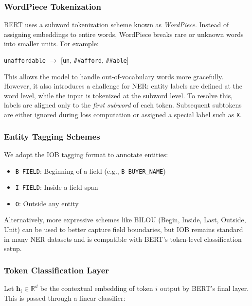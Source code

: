 \documentclass{article}
\begin{document}
\subsubsection{WordPiece Tokenization}

BERT uses a subword tokenization scheme known as \emph{WordPiece}. Instead of assigning embeddings to entire words, WordPiece breaks rare or unknown words into smaller units. For example:

\begin{center}
    \texttt{unaffordable} $\rightarrow$ [\texttt{un}, \texttt{\#\#afford}, \texttt{\#\#able}]
\end{center}

This allows the model to handle out-of-vocabulary words more gracefully. However, it also introduces a challenge for NER: entity labels are defined at the word level, while the input is tokenized at the subword level. To resolve this, labels are aligned only to the \emph{first subword} of each token. Subsequent subtokens are either ignored during loss computation or assigned a special label such as \texttt{X}.

\subsubsection{Entity Tagging Schemes}

We adopt the IOB tagging format \cite{ramshaw1995text} to annotate entities:
\begin{itemize}
    \item \texttt{B-FIELD}: Beginning of a field (e.g., \texttt{B-BUYER\_NAME})
    \item \texttt{I-FIELD}: Inside a field span
    \item \texttt{O}: Outside any entity
\end{itemize}

Alternatively, more expressive schemes like BILOU (Begin, Inside, Last, Outside, Unit) \cite{ratinov2009design} can be used to better capture field boundaries, but IOB remains standard in many NER datasets and is compatible with BERT’s token-level classification setup.

\subsubsection{Token Classification Layer}

Let $\mathbf{h}_i \in \mathbb{R}^d$ be the contextual embedding of token $i$ output by BERT's final layer. This is passed through a linear classifier:
\end{document}
